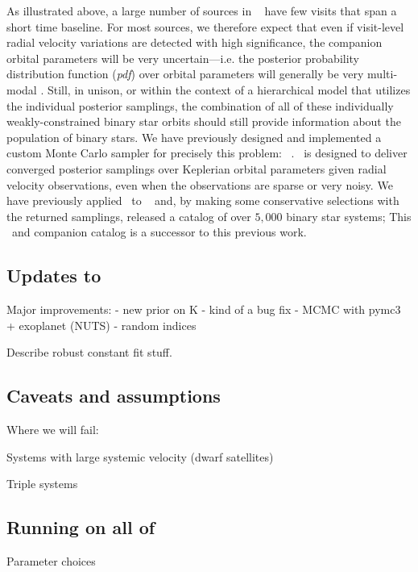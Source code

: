 \documentclass[modern]{aastex62}
\begin{document}
As illustrated above, a large number of sources in \apogee\  have few
visits that span a short time baseline.
For most sources, we therefore expect that even if visit-level radial velocity
variations are detected with high significance, the companion orbital parameters
will be very uncertain---i.e. the posterior probability distribution function
(\textsl{pdf}) over orbital parameters will generally be very multi-modal
\citep[e.g.,][]{TODO, thejoker}.
Still, in unison, or within the context of a hierarchical model that utilizes
the individual posterior samplings, the combination of all of these individually
weakly-constrained binary star orbits should still provide information about the
population of binary stars.
We have previously designed and implemented a custom Monte Carlo sampler for
precisely this problem: \thejoker\ \citep{thejoker}.
\thejoker\ is designed to deliver converged posterior samplings over Keplerian
orbital parameters given radial velocity observations, even when the
observations are sparse or very noisy.
We have previously applied \thejoker\ to \apogee\ 
\citep{Price-Whelan:2018} and, by making some conservative selections with the
returned samplings, released a catalog of over $5,000$ binary star systems;
This \documentname\ and companion catalog is a successor to this previous work.

\subsection{Updates to \thejoker}

Major improvements:
- new prior on K - kind of a bug fix
- MCMC with pymc3 + exoplanet (NUTS)
- random indices

Describe robust constant fit stuff.


\subsection{Caveats and assumptions} \label{sec:caveats}

Where we will fail:

Systems with large systemic velocity (dwarf satellites)

Triple systems


\subsection{Running on all of \apogee\ } \label{sec:rundr16}

Parameter choices
\end{document}
